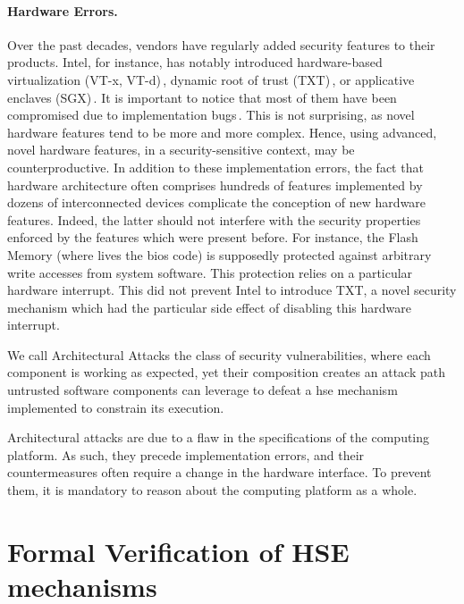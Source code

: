 \paragraph{Hardware Errors.}
%
Over the past decades, vendors have regularly added security features to their
products.
%
Intel, for instance, has notably introduced hardware-based virtualization (VT-x,
VT-d)\,\cite{intel2014manualvt}, dynamic root of trust
(TXT)\,\cite{intel2015txt}, or applicative enclaves
(SGX)\,\cite{intel2014manualsgx,costan2016sgxexplained}.
%
It is important to notice that most of them have been compromised due to
implementation bugs\,\cite{wojtczuk2011txtbug,sang2010iommu}.
%
This is not surprising, as novel hardware features tend to be more and more
complex.
%
Hence, using advanced, novel hardware features, in a security-sensitive context,
may be counterproductive.
%
In addition to these implementation errors, the fact that hardware architecture
often comprises hundreds of features implemented by dozens of interconnected
devices complicate the conception of new hardware features.
%
Indeed, the latter should not interfere with the security properties enforced by
the features which were present before.
%
For instance, the Flash Memory (where lives the \ac{bios} code) is supposedly
protected against arbitrary write accesses from system software.
%
This protection relies on a particular hardware interrupt.
%
This did not prevent Intel to introduce TXT, a novel security mechanism which
had the particular side effect of disabling this hardware interrupt.

\begin{definition}
  We call Architectural Attacks the class of security vulnerabilities, where
  each component is working as expected, yet their composition creates an attack
  path untrusted software components can leverage to defeat a \ac{hse} mechanism
  implemented to constrain its execution.
\end{definition}

Architectural attacks are due to a flaw in the specifications of the computing
platform.
%
As such, they precede implementation errors, and their countermeasures often
require a change in the hardware interface.
%
To prevent them, it is mandatory to reason about the computing platform as a
whole.

\section{Formal Verification of HSE mechanisms}
\label{sec:intro:verif}

